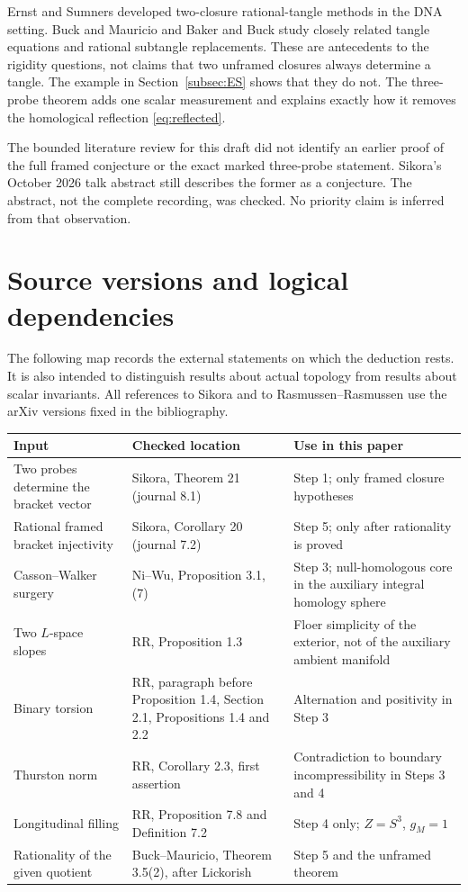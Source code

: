 \documentclass[11pt]{amsart}
\theoremstyle{definition}
\theoremstyle{remark}
\begin{document}
Ernst and
Sumners
\cite{ES}
developed
two-closure
rational-tangle
methods in the
DNA setting.
Buck and
Mauricio
\cite{BM}
and Baker and
Buck
\cite{BakerBuck}
study closely
related tangle
equations and
rational
subtangle
replacements.
These are
antecedents to
the rigidity
questions, not
claims that
two unframed
closures always
determine a
tangle. The
example in
Section~\ref{subsec:ES}
shows that they
do not.
The three-probe
theorem adds one
scalar measurement
and explains
exactly how it
removes the
homological
reflection
\eqref{eq:reflected}.

The bounded
literature review
for this draft
did not identify
an earlier proof
of the full
framed conjecture
or the exact
marked
three-probe
statement.
Sikora's October
2026 talk
abstract
\cite{SikoraTalk}
still describes
the former as
a conjecture.
The abstract,
not the complete
recording, was
checked. No
priority claim
is inferred
from that
observation.

\appendix
\section{Source versions and logical dependencies}

The following map records the external statements on which the deduction
rests. It is also intended to distinguish results about actual topology
from results about scalar invariants. All references to Sikora and to
Rasmussen--Rasmussen use the arXiv versions fixed in the bibliography.

\begin{center}
\small
\begin{tabular}{>{\raggedright\arraybackslash}p{}>{\raggedright\arraybackslash}p{}>{\raggedright\arraybackslash}p{}}
\hline
Input & Checked location & Use in this paper \\
\hline
Two probes determine the bracket vector & Sikora, Theorem 21 (journal 8.1) & Step 1; only framed closure hypotheses \\
Rational framed bracket injectivity & Sikora, Corollary 20 (journal 7.2) & Step 5; only after rationality is proved \\
Casson--Walker surgery & Ni--Wu, Proposition 3.1, (7) & Step 3; null-homologous core in the auxiliary integral homology sphere \\
Two \(L\)-space slopes & RR, Proposition 1.3 & Floer simplicity of the exterior, not of the auxiliary ambient manifold \\
Binary torsion & RR, paragraph before Proposition 1.4, Section 2.1, Propositions 1.4 and 2.2 & Alternation and positivity in Step 3 \\
Thurston norm & RR, Corollary 2.3, first assertion & Contradiction to boundary incompressibility in Steps 3 and 4 \\
Longitudinal filling & RR, Proposition 7.8 and Definition 7.2 & Step 4 only; \(Z=S^3\), \(g_M=1\) \\
Rationality of the given quotient & Buck--Mauricio, Theorem 3.5(2), after Lickorish & Step 5 and the unframed theorem \\
\hline
\end{tabular}
\end{center}
\end{document}

